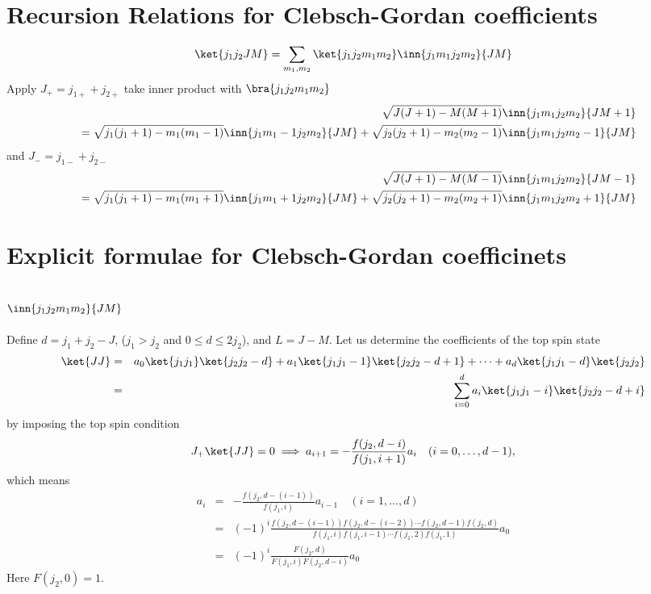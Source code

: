 \documentclass{article}
\begin{document}
\section{Recursion Relations for Clebsch-Gordan coefficients}
\label{sec-3}
\begin{equation}
\label{}
\ket{j_1j_2 JM} = \sum_{m_1,m_2} \ket{j_1 j_2m_1m_2}\inn{j_1 m_1j_2m_2}{JM}
\end{equation}
Apply $J_+ = j_{1+} + j_{2+}$ take inner product with $\bra{j_1j_2m_1m_2}$
\begin{eqnarray}
&&\sqrt{J(J+1) - M(M+1)}\inn{j_1 m_1j_2m_2}{JM+1}  \nonumber\\
&&=  \sqrt{j_1(j_1+1) - m_1(m_1-1)}\inn{j_1 m_1-1j_2m_2}{JM} +   \sqrt{j_2(j_2+1) - m_2(m_2-1)}\inn{j_1 m_1j_2m_2-1}{JM}\nonumber\\
\end{eqnarray}
and $J_- = j_{1-} + j_{2-}$ 
\begin{eqnarray}
&&\sqrt{J(J+1) - M(M-1)}\inn{j_1 m_1j_2m_2}{JM-1}  \nonumber\\
&&=  \sqrt{j_1(j_1+1) - m_1(m_1+1)}\inn{j_1 m_1+1j_2m_2}{JM} +   \sqrt{j_2(j_2+1) - m_2(m_2+1)}\inn{j_1 m_1j_2m_2+1}{JM}\nonumber\\
\end{eqnarray}

\section{Explicit formulae for Clebsch-Gordan coefficinets}
\label{sec-4}
\subsection{$\inn{j_1j_2m_1m_2}{JM}$}
\label{sec-4-1}
Define $d=j_1+j_2 -J$, ($j_1 > j_2$ and $0\le d \le 2j_2$), and $L = J-M$. Let us determine the coefficients of the top spin state
\begin{eqnarray}
\ket{JJ}  &=&  a_0\ket{j_1j_1}\ket{j_2j_2-d} + a_1\ket{j_1j_1-1}\ket{j_2j_2-d+1} + \cdots + a_d\ket{j_1j_1-d}\ket{j_2j_2} \nonumber\\
 & = & \sum_{i=0}^{d} a_i\ket{j_1j_1-i}\ket{j_2j_2-d+i}
\end{eqnarray}
by imposing the top spin condition
\begin{equation}
\label{ }
J_{+}\ket{JJ}  =  0 \implies a_{i+1}=-\frac{f(j_2,d-i)}{f(j_1,i+1)}a_i \quad (i=0,\ldots,d-1),
\end{equation}
which means
\begin{eqnarray}
 a_{i} & = & -\frac{f(j_2,d-(i-1))}{f(j_1,i)}a_{i-1} \quad (i=1,\ldots,d)\\
       & = & (-1)^i\frac{f(j_2,d-(i-1))f(j_2,d-(i-2)) \cdots f(j_2,d-1)f(j_2,d)}{f(j_1,i)f(j_1,i-1) \cdots f(j_1,2)f(j_1,1)}a_{0} \\
       & = & (-1)^i\frac{F(j_2,d)}{F(j_1,i)F(j_2,d-i)} a_{0} 
\end{eqnarray}
Here $F(j_2,0)=1$.
\end{document}
